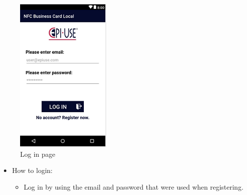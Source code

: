 \documentclass[english]{article}
\begin{document}
			\begin{figure}[H]
				\centering
			\includegraphics[scale=0.7]{Login.png}
				\caption{Log in page}
				\label{figure: 1}
			\end{figure}

	\begin{itemize}
		\item How to login:
		\begin{itemize}
			\item Log in by using the email and password that were used when registering.
		\end{itemize}	
	\end{itemize}
\end{document}
